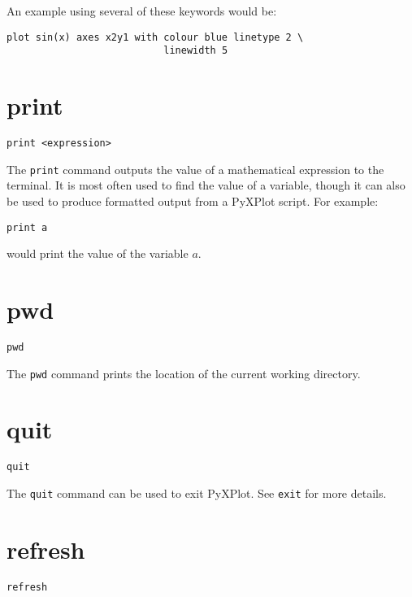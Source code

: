 An example using several of these keywords would be:

\begin{verbatim}
plot sin(x) axes x2y1 with colour blue linetype 2 \
                           linewidth 5
\end{verbatim}


\section{print}

\begin{verbatim}
print <expression>
\end{verbatim}

The {\tt print} command outputs the value of a mathematical expression to the
terminal.  It is most often used to find the value of a variable, though it can
also be used to produce formatted output from a PyXPlot script. For example:

\begin{verbatim}
print a
\end{verbatim}

\noindent would print the value of the variable $a$.


\section{pwd}

\begin{verbatim}
pwd
\end{verbatim}

The {\tt pwd} command prints the location of the current working directory.



\section{quit}

\begin{verbatim}
quit
\end{verbatim}

The {\tt quit} command can be used to exit PyXPlot. See {\tt exit} for more
details.

\section{refresh}

\begin{verbatim}
refresh
\end{verbatim}

